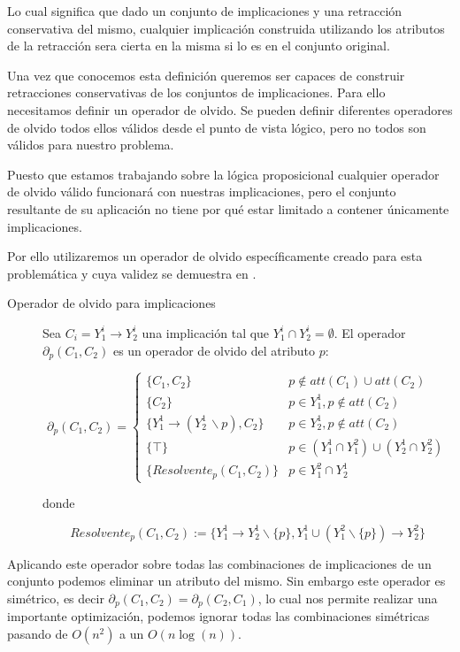 Lo cual significa que dado un conjunto de implicaciones y una retracción conservativa del mismo, cualquier implicación construida utilizando los atributos de la retracción sera cierta en la misma si lo es en el conjunto original.

Una vez que conocemos esta definición queremos ser capaces de construir retracciones conservativas de los conjuntos de implicaciones. Para ello necesitamos definir un operador de olvido. Se pueden definir diferentes operadores de olvido todos ellos válidos desde el punto de vista lógico, pero no todos son válidos para nuestro problema.

Puesto que estamos trabajando sobre la lógica proposicional cualquier operador de olvido válido funcionará con nuestras implicaciones, pero el conjunto resultante de su aplicación no tiene por qué estar limitado a contener únicamente implicaciones. 

Por ello utilizaremos un operador de olvido específicamente creado para esta problemática y cuya validez se demuestra en .



\begin{description}
	\item[Operador de olvido para implicaciones] 
	Sea $C_i = Y_{1}^i \rightarrow Y_{2}^i$  una implicación tal que $Y_{1}^i \cap Y_{2}^i = \emptyset$. El operador $\partial_p (C_1, C_2)$ es un operador de olvido del atributo $p$:
	
	\begin{equation}
	\label{operadorOlvido}
	\partial_p (C_1, C_2) = 			
	\begin{cases} 
	\{C_1, C_2\} & p \notin att(C_1) \cup att(C_2) \\
	\{C_2\} &  p \in Y_1^1, p \notin att(C_2) \\
	\{Y_1^1 \rightarrow (Y_2^1 \, \backslash p) , C_2\} & p \in Y_2^1, p \notin att(C_2) \\
	\{ \top \} & p \in (Y_1^1 \cap Y_1^2) \cup (Y_2^1 \cap Y_2^2) \\
	\{Resolvente_p(C_1, C_2)\} & p \in Y_1^2 \cap Y_2^1
	\end{cases}
	\end{equation}
	
	donde 
	
	\[
	Resolvente_p(C_1, C_2) := \{Y_1^1 \rightarrow Y_2^1 \backslash \{p\}, Y_1^1 \cup (Y_1^2 \backslash \{p\}) \rightarrow Y_2^2 \}
	\]
	
\end{description}

Aplicando este operador sobre todas las combinaciones de implicaciones de un conjunto podemos eliminar un atributo del mismo. Sin embargo este operador es simétrico, es decir $\partial_p (C_1, C_2) = \partial_p (C_2, C_1)$, lo cual nos permite realizar una importante optimización, podemos ignorar todas las combinaciones simétricas pasando de $O(n^2)$ a un $O(n\log(n))$.




	

